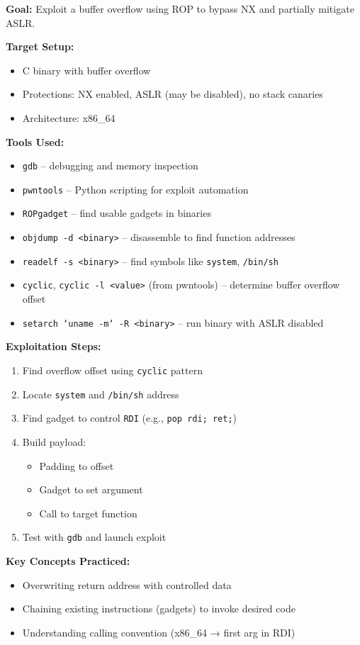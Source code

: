 {
\textbf{Goal:} Exploit a buffer overflow using ROP to bypass NX and partially mitigate ASLR.

\textbf{Target Setup:}
\begin{itemize}[noitemsep]
  \item C binary with buffer overflow
  \item Protections: NX enabled, ASLR (may be disabled), no stack canaries
  \item Architecture: x86\_64
\end{itemize}

\textbf{Tools Used:}
\begin{itemize}[noitemsep]
  \item \texttt{gdb} – debugging and memory inspection
  \item \texttt{pwntools} – Python scripting for exploit automation
  \item \texttt{ROPgadget} – find usable gadgets in binaries
  \item \texttt{objdump -d <binary>} – disassemble to find function addresses
  \item \texttt{readelf -s <binary>} – find symbols like \texttt{system}, \texttt{/bin/sh}
  \item \texttt{cyclic}, \texttt{cyclic -l <value>} (from pwntools) – determine buffer overflow offset
  \item \texttt{setarch `uname -m` -R <binary>} – run binary with ASLR disabled
\end{itemize}

\textbf{Exploitation Steps:}
\begin{enumerate}[noitemsep]
  \item Find overflow offset using \texttt{cyclic} pattern
  \item Locate \texttt{system} and \texttt{/bin/sh} address
  \item Find gadget to control \texttt{RDI} (e.g., \texttt{pop rdi; ret;})
  \item Build payload:
    \begin{itemize}
      \item Padding to offset
      \item Gadget to set argument
      \item Call to target function
    \end{itemize}
  \item Test with \texttt{gdb} and launch exploit
\end{enumerate}


\textbf{Key Concepts Practiced:}
\begin{itemize}[noitemsep]
  \item Overwriting return address with controlled data
  \item Chaining existing instructions (gadgets) to invoke desired code
  \item Understanding calling convention (x86\_64 → first arg in RDI)
\end{itemize}
}
